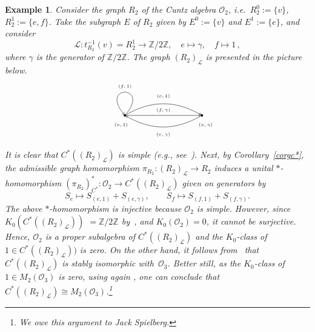 \documentclass[12pt,times,a4paper]{amsart}
\newtheorem{example}[theorem]{Example}
\numberwithin{equation}{section}
\numberwithin{equation}{section}
\begin{document}
\begin{example}
{\rm 
Consider the graph $R_2$ of the Cuntz algebra $\mathcal{O}_2$, i.e.\ $R^0_2:=\{v\}$, $R^1_2:=\{e,f\}$.
Take the subgraph $E$ of $R_2$ given by $E^0:=\{v\}$ and $E^1:=\{e\}$, and consider
\[
\mathcal{L}:t_{R_2}^{-1}(v)=R^1_2\longrightarrow \mathbb{Z}/2\mathbb{Z},\quad e\longmapsto \gamma,\quad f\longmapsto 1\,,
\]
where $\gamma$ is the generator of $\mathbb{Z}/2\mathbb{Z}$. The graph $(R_2)_\mathcal{L}$ is presented in the picture below.
\[
\begin{tikzpicture}[scale=0.8,auto,swap]
\centering
\tikzstyle{vertex}=[circle,fill=black,minimum size=3pt,inner sep=0pt]
\tikzstyle{edge}=[draw,->]
\tikzset{every loop/.style={min distance=20mm,in=130,out=50,looseness=40}}
    \node[vertex] (1) at (-2,0) {};
    \node[vertex] (2) at (2,0) {};
    \node (3) at (-2.2,-0.5) {\tiny $(v,1)$};
    \node (4) at (2.2,-0.5) {\tiny $(v,\gamma)$};
    \node (5) at (-2,1.5) {\tiny $(f,1)$};
    \node (6) at (0,1) {\tiny $(e,1)$};
    \node (7) at (0,0.275) {\tiny $(f,\gamma)$};
    \node (8) at (0,-1) {\tiny $(e,\gamma)$};
    \path (1) edge [edge, anchor=center, loop above] node {} (1);
    \path (1) edge [edge, bend left] node {} (2);
    \path (2) edge [edge, bend left] node {} (1);
    \path (1) edge [edge] node {} (2);
\end{tikzpicture}
\]
It is clear that $C^*((R_2)_\mathcal{L})$ is simple (e.g., see~\cite[Proposition~4.2]{i-r05}). Next, by Corollary~\ref{corgc*}, the admissible graph 
homomorphism $\pi_{R_2}:(R_2)_\mathcal{L}\to R_2$ induces a unital $*$-homomorphism 
$(\pi_{R_2})^*_{C^*}\colon\mathcal{O}_2\to C^*((R_2)_\mathcal{L})$ given on generators by
\[
S_e\longmapsto S_{(e,1)}+S_{(e,\gamma)},\qquad S_f\longmapsto S_{(f,1)}+S_{(f,\gamma)}.
\]
The above $*$-homomorphism is injective because $\mathcal{O}_2$ is simple. However,
since $K_0(C^*((R_2)_\mathcal{L}))$ \mbox{$=\mathbb{Z}/2\mathbb{Z}$} by~\cite[Theorem~7.16]{i-r05}, 
and $K_0(\mathcal{O}_2)=0$, it cannot be surjective. Hence, $\mathcal{O}_2$ is a proper subalgebra of 
$C^*((R_2)_\mathcal{L})$ and the $K_0$-class of $1\in  C^*((R_2)_\mathcal{L}))$ is zero. On the other hand, it follows 
from~\cite[Theorem~6.5]{m-r95} that $C^*((R_2)_\mathcal{L})$ is stably isomorphic with~$\mathcal{O}_3$. Better still, as the $K_0$-class of $1\in M_2(\mathcal{O}_3)$ is zero, using again \cite[Theorem~6.5]{m-r95}, one can conclude
 that $C^*((R_2)_\mathcal{L})\cong M_2(\mathcal{O}_3)$.\footnote{
We owe this argument to Jack Spielberg.}
}
\end{example}
\end{document}

